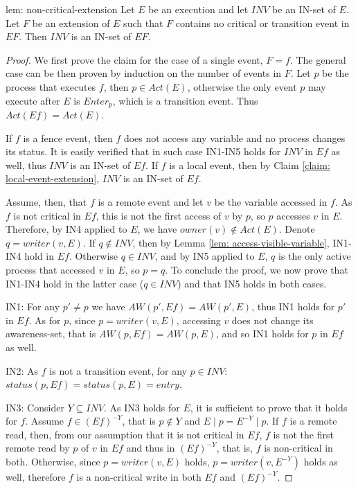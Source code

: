 \begin{lemma-repeat} {lem: non-critical-extension}
	Let $E$ be an execution and let $\mathit{INV}$ be an IN-set of $E$. Let $F$ be an extension of $E$ such that $F$ contains no critical or transition event in $E F$. Then $\mathit{INV}$ is an IN-set of $E F$.
\end{lemma-repeat}

\begin{proof}
	We first prove the claim for the case of a single event, $F = f$. The general case can be then proven by induction on the number of events in $F$. Let $p$ be the process that executes $f$, then $p \in Act(E)$, otherwise the only event $p$ may execute after $E$ is $Enter_p$, which is a transition event. Thus $Act(E f) = Act(E)$.
	
	If $f$ is a fence event, then $f$ does not access any variable and no process changes its status. It is easily verified that in such case IN1-IN5 holds for $INV$ in $E f$ as well, thus $INV$ is an IN-set of $E f$. If $f$ is a local event, then by Claim \ref{claim: local-event-extension}, $INV$ is an IN-set of $E f$.
	
	Assume, then, that $f$ is a remote event and let $v$ be the variable accessed in $f$. As $f$ is not critical in $E f$, this is not the first access of $v$ by $p$, so $p$ accesses $v$ in $E$. Therefore, by IN4 applied to $E$, we have $owner(v) \notin Act(E)$. Denote $q = writer(v,E)$. If $q \notin INV$, then by Lemma \ref{lem: access-visible-variable}, IN1-IN4 hold in $E f$. Otherwise $q \in INV$, and by IN5 applied to $E$, $q$ is the only active process that accessed $v$ in $E$, so $p=q$. To conclude the proof, we now prove that IN1-IN4 hold in the latter case ($q \in INV$) and that IN5 holds in both cases.
	
	IN1: For any $p' \neq p$ we have $AW(p',E f) = AW(p',E)$, thus IN1 holds for $p'$ in $E f$. As for $p$, since $p = writer(v,E)$, accessing $v$ does not change its awareness-set, that is $AW(p,E f) = AW(p,E)$, and so IN1 holds for $p$ in $E f$ as well.
	
	IN2: As $f$ is not a transition event, for any $p \in INV$: $status(p,E f) = status(p,E) = entry$.
	
	IN3: Consider $Y \subseteq INV$. As IN3 holds for $E$, it is sufficient to prove that it holds for $f$. Assume $f \in (E f)^{-Y}$, that is $p \notin Y$ and $E \mid p = E^{-Y} \mid p$. If $f$ is a remote read, then, from our assumption that it is not critical in $Ef$,  $f$ is not the first remote read by $p$ of $v$ in $E f$ and thus in $(E f)^{-Y}$, that is, $f$ is non-critical in both. Otherwise, since $p = writer(v,E)$ holds, $p = writer(v,E^{-Y})$ holds as well, therefore $f$ is a non-critical write in both $E f$ and $(E f)^{-Y}$.
	

\end{proof}
